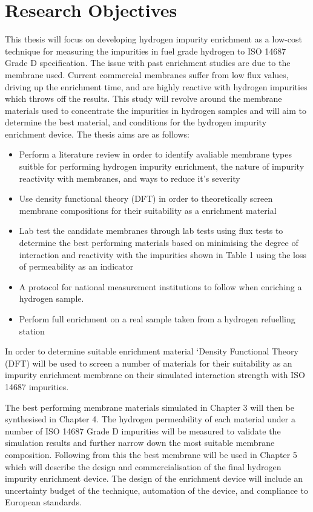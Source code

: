 \section{Research Objectives}
This thesis will focus on developing hydrogen impurity enrichment as a low-cost technique for measuring 
the impurities in fuel grade hydrogen to ISO 14687 Grade D specification. The issue with past enrichment studies are due to the membrane used. Current commercial membranes suffer from low flux values, driving up the enrichment time, and are highly reactive with hydrogen impurities which throws off the results. This study will revolve around the membrane materials used to concentrate the impurities in hydrogen samples 
and will aim to determine the best material, and conditions for the hydrogen impurity enrichment device. 
The thesis aims are as follows:
\begin{itemize}
\item Perform a literature review in order to identify avaliable membrane types suitble for performing hydrogen impurity enrichment, the nature of impurity reactivity with membranes, and ways to reduce it's severity
\item Use density functional theory (DFT) in order to theoretically screen membrane compositions for their suitability as a enrichment material
\item Lab test the candidate membranes through lab tests using flux tests to determine the best performing materials based on minimising the degree of interaction and reactivity with the impurities shown in Table 1 using the loss of permeability as an indicator
\item A protocol for national measurement institutions to follow when enriching a hydrogen sample. 
\item Perform full enrichment on a real sample taken from a hydrogen refuelling station
\end{itemize}
In order to determine suitable enrichment material ‘Density Functional Theory (DFT) will be used to screen a number of materials for their suitability as an impurity enrichment membrane on their simulated 
interaction strength with ISO 14687 impurities. 

The best performing membrane materials simulated in Chapter 3 will then be synthesised in Chapter 4. 
The hydrogen permeability of each material under a number of ISO 14687 Grade D impurities will be measured to 
validate the simulation results and further narrow down the most suitable membrane composition. 
Following from this the best membrane will be used in Chapter 5 which will describe the design and 
commercialisation of the final hydrogen impurity enrichment device. The design of the enrichment device 
will include an uncertainty budget of the technique, automation of the device, and compliance to European standards.

